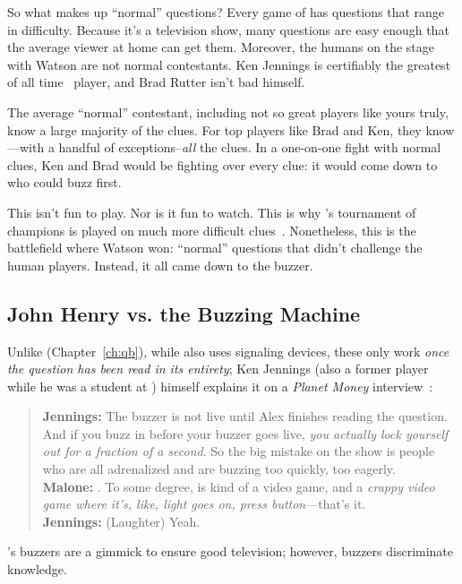 So what makes up ``normal'' questions?
%
Every game of \jeopardy{} has questions that range in difficulty.
%
Because it's a television show, many questions are easy enough that
the average viewer at home can get them.
%
Moreover, the humans on the stage with Watson are not normal contestants.
%
Ken Jennings is certifiably the greatest of all
time~\citep[]{low-20} \jeopardy{} player, and Brad Rutter
isn't bad himself.

The average ``normal'' \jeopardy{} contestant, including not so great
players like yours truly, know a large majority of the clues.
%
For top players like Brad and Ken, they know---with a handful of
exceptions--\emph{all} the clues.
%
In a one-on-one fight with normal clues, Ken and Brad would be
fighting over every clue: it would come down to who could buzz first.

This isn't fun to play.
%
Nor is it fun to watch.
%
This is why \jeopardyp{}'s tournament of champions is played on much
more difficult clues~\citep{harris-06}.
%
Nonetheless, this is the battlefield where Watson won: ``normal''
questions that didn't challenge the human players.
%
Instead, it all came down to the buzzer.

\subsection{John Henry vs. the Buzzing Machine}

Unlike \qb{} (Chapter~\ref{ch:qb}), while \jeopardy{} also uses
signaling devices, these only work \emph{once the question has been
  read in its entirety}; Ken Jennings (also a former \qb{} player while he was a student at
) himself explains it on a \textit{Planet Money}
interview~\citep{malone-19}:
\begin{quote}
{\bf Jennings:} The buzzer is
    not live until Alex finishes reading the question. And if you buzz
    in before your buzzer goes live, \emph{you actually lock yourself out
    for a fraction of a second}. So the big mistake on the show is
    people who are all adrenalized and are buzzing too quickly, too
    eagerly. \\
{\bf Malone:} . To some degree, \jeopardy{} is kind of a video game, and a \emph{crappy video game where it's, like, light goes on, press button}---that's it. \\
{\bf Jennings:} (Laughter) Yeah. \\
\end{quote}
\jeopardy{}'s buzzers are a gimmick to ensure good television; however, \qb{} buzzers discriminate knowledge.

